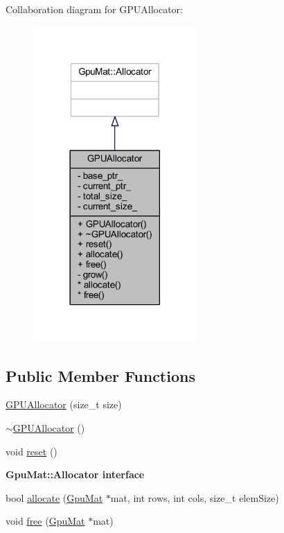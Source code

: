 Collaboration diagram for G\+P\+U\+Allocator\+:\nopagebreak
\begin{figure}[H]
\begin{center}
\leavevmode
\includegraphics[width=177pt]{class_g_p_u_allocator__coll__graph}
\end{center}
\end{figure}
\subsection*{Public Member Functions}
\begin{DoxyCompactItemize}
\item 
\mbox{\hyperlink{class_g_p_u_allocator_aa98cb14ed329cc0dfd99982da0d9b671}{G\+P\+U\+Allocator}} (size\+\_\+t size)
\item 
\mbox{\hyperlink{class_g_p_u_allocator_aacf971bf00e58690d44a52b9649d6e8d}{$\sim$\+G\+P\+U\+Allocator}} ()
\item 
void \mbox{\hyperlink{class_g_p_u_allocator_a4734a73038db3517f88a64e6b5f556ef}{reset}} ()
\end{DoxyCompactItemize}
\begin{Indent}\textbf{ Gpu\+Mat\+:\+:Allocator interface}\par
\begin{DoxyCompactItemize}
\item 
bool \mbox{\hyperlink{class_g_p_u_allocator_abe0cecfd551e4824ed5522721dea76ca}{allocate}} (\mbox{\hyperlink{gpu__allocator_8h_aa7700da124206551c0f9d273152f13fb}{Gpu\+Mat}} $\ast$mat, int rows, int cols, size\+\_\+t elem\+Size)
\item 
void \mbox{\hyperlink{class_g_p_u_allocator_a539a3d2909976f47ca7d109522c23ece}{free}} (\mbox{\hyperlink{gpu__allocator_8h_aa7700da124206551c0f9d273152f13fb}{Gpu\+Mat}} $\ast$mat)
\end{DoxyCompactItemize}
\end{Indent}
